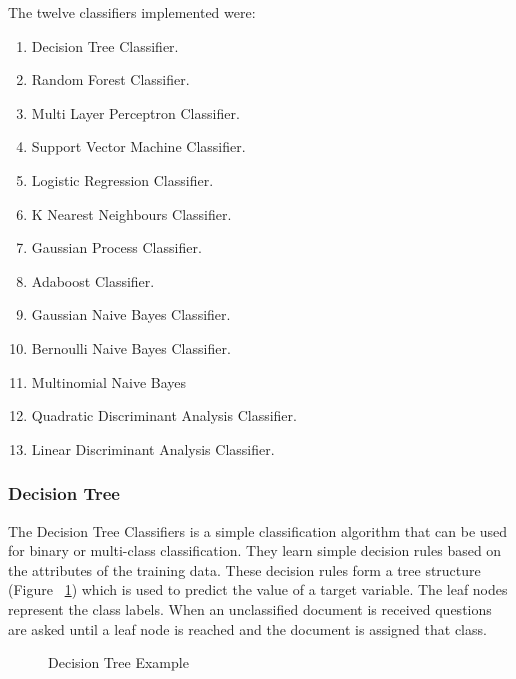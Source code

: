 The twelve classifiers implemented were:
\begin{enumerate}
    \item Decision Tree Classifier.
    \item Random Forest Classifier.
    \item Multi Layer Perceptron Classifier.
    \item Support Vector Machine Classifier.
    \item Logistic Regression Classifier.
    \item K Nearest Neighbours Classifier.
    \item Gaussian Process Classifier.
    \item Adaboost Classifier.
    \item Gaussian Naive Bayes Classifier.
    \item Bernoulli Naive Bayes Classifier.
    \item Multinomial Naive Bayes
    \item Quadratic Discriminant Analysis Classifier.
    \item Linear Discriminant Analysis Classifier.
\end{enumerate}

\subsubsection*{Decision Tree}

The Decision Tree Classifiers is a simple classification algorithm that can be used for binary or multi-class classification. They learn simple decision rules based on the attributes of the training data. These decision rules form a tree structure (Figure ~\ref{fig:decisiontree}) which is used to predict the value of a target variable. The leaf nodes represent the class labels. When an unclassified document is received questions are asked until a leaf node is reached and the document is assigned that class.

\begin{figure}[h!]
\centering
{}
\caption{\label{fig:decisiontree} Decision Tree Example}
\end{figure}

